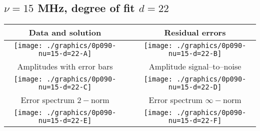 

% 

\clearpage{}
\break{}

\subsection{$\nu = 15$ MHz, degree of fit $d = 22$}

\begin{table}[h]
    \begin{center}
        \begin{tabular}{ccc}
            Data and solution & \quad & Residual errors \\\hline
            \texttt{[image: ./graphics/0p090-nu=15-d=22-A]} &&
            \texttt{[image: ./graphics/0p090-nu=15-d=22-B]} \\[15pt]
            Amplitudes with error bars && Amplitude signal--to--noise \\\hline
            \texttt{[image: ./graphics/0p090-nu=15-d=22-C]} &&
            \texttt{[image: ./graphics/0p090-nu=15-d=22-D]} \\[15pt]
            Error spectrum $2-$norm && Error spectrum $\infty-$norm \\\hline
            \texttt{[image: ./graphics/0p090-nu=15-d=22-E]} &&
            \texttt{[image: ./graphics/0p090-nu=15-d=22-F]} \\[15pt]
        \end{tabular}
    \end{center}
\label{fig:elev=90, nu=15}
\end{table}



\endinput

